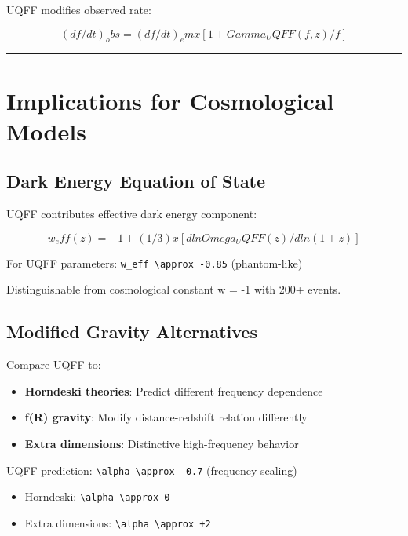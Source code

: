 \documentclass[12pt,a4paper]{article}
\begin{document}
UQFF modifies observed rate:

\begin{equation}
(df/dt)_obs = (df/dt)_em x [1 + Gamma_UQFF(f,z)/f]
\end{equation}

\medskip\hrule\medskip

\section{Implications for Cosmological Models}

\subsection{Dark Energy Equation of State}

UQFF contributes effective dark energy component:

\begin{equation}
w_eff(z) = -1 + (1/3) x [d ln Omega_UQFF(z) / d ln(1+z)]
\end{equation}

For UQFF parameters: \texttt{w\_eff \textbackslash approx -0.85} (phantom-like)

Distinguishable from cosmological constant w = -1 with 200+ events.

\subsection{Modified Gravity Alternatives}

Compare UQFF to:

\begin{itemize}
  \item \textbf{Horndeski theories}: Predict different frequency dependence
  \item \textbf{f(R) gravity}: Modify distance-redshift relation differently
  \item \textbf{Extra dimensions}: Distinctive high-frequency behavior
\end{itemize}

UQFF prediction: \texttt{\textbackslash alpha \textbackslash approx -0.7} (frequency scaling)

\begin{itemize}
  \item Horndeski: \texttt{\textbackslash alpha \textbackslash approx 0}
  \item Extra dimensions: \texttt{\textbackslash alpha \textbackslash approx +2}
\end{itemize}
\end{document}
